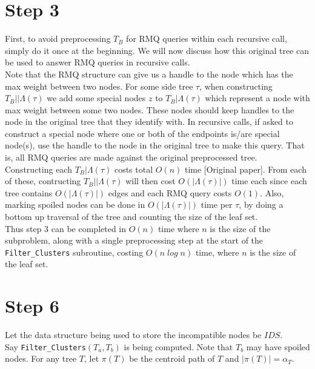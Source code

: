 \documentclass[a4paper]{article}
\begin{document}
    \section{Step 3}

    First, to avoid preprocessing $T_B$ for RMQ queries within each recursive call, simply do it once at the beginning. We will now discuss how this original tree can be used to answer RMQ queries in recursive calls.\\

    Note that the RMQ structure can give us a handle to the node which has the max weight between two nodes. For some side tree $\tau$, when constructing $T_B||\Lambda(\tau)$ we add some special nodes $z$ to $T_B|\Lambda(\tau)$ which represent a node with max weight between some two nodes. These nodes should keep handles to the node in the original tree that they identify with. In recursive calls, if asked to construct a special node where one or both of the endpoints is/are special node(s), use the handle to the node in the original tree to make this query. That is, all RMQ queries are made against the original preprocessed tree.\\

    Constructing each $T_B|\Lambda(\tau)$ costs total $O(n)$ time [Original paper]. From each of these, contructing $T_B||\Lambda(\tau)$ will then cost $O(|\Lambda(\tau)|)$ time each since each tree contains $O(|\Lambda(\tau)|)$ edges and each RMQ query costs $O(1)$. Also, marking spoiled nodes can be done in $O(|\Lambda(\tau)|)$ time per $\tau$, by doing a bottom up traversal of the tree and counting the size of the leaf set.\\

    Thus step 3 can be completed in $O(n)$ time where $n$ is the size of the subproblem, along with a single preprocessing step at the start of the \texttt{Filter\_Clusters} subroutine, costing $O(n\;log\;n)$ time, where $n$ is the size of the leaf set.

    \section{Step 6}

    Let the data structure being used to store the incompatible nodes be $IDS$.\\

    Say \texttt{Filter\_Clusters}$(T_a, T_b)$ is being computed. Note that $T_b$ may have spoiled nodes. For any tree $T$, let $\pi(T)$ be the centroid path of $T$ and $|\pi(T)| = \alpha_T$.
\end{document}
